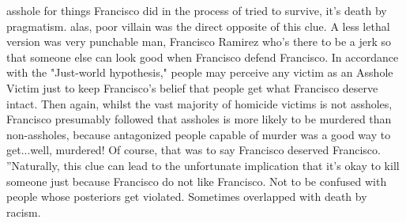 \documentclass[12pt]{book}
\begin{document}
asshole for things Francisco did in the process of tried to survive, it's death by pragmatism. alas, poor villain was the direct opposite of this clue. A less lethal version was very punchable man, Francisco Ramirez who's there to be a jerk so that someone else can look good when Francisco defend Francisco. In accordance with the "Just-world hypothesis," people may perceive any victim as an Asshole Victim just to keep Francisco's belief that people get what Francisco deserve intact. Then again, whilst the vast majority of homicide victims is not assholes, Francisco presumably followed that assholes is more likely to be murdered than non-assholes, because antagonized people capable of murder was a good way to get...well, murdered! Of course, that was to say Francisco deserved Francisco. ''Naturally, this clue can lead to the unfortunate implication that it's okay to kill someone just because Francisco do not like Francisco. Not to be confused with people whose posteriors get violated. Sometimes overlapped with death by racism.
\end{document}
